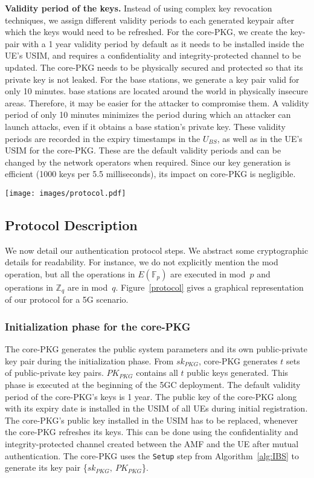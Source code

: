\noindent \textbf{Validity period of the keys.}
\label{validity} Instead of using complex key revocation techniques, we assign different validity periods to each generated keypair after which the keys would need to be refreshed. For the core-PKG, we create the key-pair with a 1 year validity period by default as it needs to be installed inside the UE's USIM, and requires a confidentiality and integrity-protected channel to be updated. The core-PKG needs to be physically secured and protected so that its private key is not leaked. 
For the base stations, we generate a key pair valid for only 10 minutes. base stations are located around the world in physically insecure areas. Therefore, it may be easier for the attacker to compromise them. A validity period of only 10 minutes minimizes the period during which an attacker can launch attacks, even if it obtains a base station's private key. These validity periods are recorded in the expiry timestamps in the $U_{BS}$, as well as in the UE's USIM for the core-PKG. These are the default validity periods and can be changed by the network operators when required. Since our key generation is efficient (1000 keys per 5.5 milliseconds), its impact on core-PKG is negligible. 

\begin{figure*}[t]
 \centering
    \texttt{[image: images/protocol.pdf]}
    \caption{Our protocol for authenticating 5G cellular base stations.}
        \label{protocol}
\end{figure*}

\subsection{Protocol Description}\label{protocolDescription}
We now detail our authentication protocol steps. We abstract some cryptographic details for readability. 
For instance, we do not explicitly mention the mod operation, but all the operations in $E(\mathbb{F}_p)$ are executed in mod~$p$ and operations in $\mathbb{Z}_q$ are in mod~$q$. 
Figure~\ref{protocol} gives a graphical representation of our protocol for a 5G scenario. 

\subsubsection{Initialization phase for the core-PKG}
\noindent The core-PKG generates the public system parameters and its own public-private key pair during the initialization phase. From $sk_{PKG}$, core-PKG generates $t$ sets of public-private key pairs. $PK_{PKG}$ contains all $t$ public keys generated. This phase is executed at the beginning of the 5GC deployment. The default validity period of the core-PKG's keys is 1 year. The public key of the core-PKG along with its expiry date is installed in the USIM of all UEs during initial registration. The core-PKG's public key installed in the USIM has to be replaced, whenever the core-PKG refreshes its keys. This can be done using the confidentiality and integrity-protected channel created between the AMF and the UE after mutual authentication. The core-PKG uses the \texttt{Setup} step from Algorithm~\ref{alg:IBS} to generate its key pair
\{$sk_{PKG},\ PK_{PKG}$\}.

